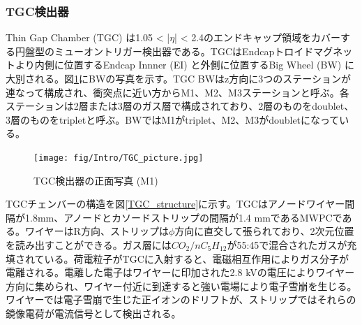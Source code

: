 \subsubsection*{TGC検出器}
Thin Gap Chamber  (TGC) は1.05 < |$\eta$| < 2.4のエンドキャップ領域をカバーする円盤型のミューオントリガー検出器である。TGCはEndcapトロイドマグネットより内側に位置するEndcap Innner  (EI) と外側に位置するBig Wheel  (BW) に大別される。図\ref{TGC_picture}にBWの写真を示す。TGC BWはz方向に3つのステーションが連なって構成され、衝突点に近い方からM1、M2、M3ステーションと呼ぶ。各ステーションは2層または3層のガス層で構成されており、2層のものをdoublet、3層のものをtripletと呼ぶ。BWではM1がtriplet、M2、M3がdoubletになっている。

\begin{figure} 
\centering
\texttt{[image: fig/Intro/TGC\_picture.jpg]}
\caption[TGC検出器]{TGC検出器の正面写真 (M1)\cite{cern_document_server}}
\label{TGC_picture}
\end{figure}

TGCチェンバーの構造を図\ref{TGC_structure}に示す。TGCはアノードワイヤー間隔が1.8mm、アノードとカソードストリップの間隔が1.4 mmであるMWPCである。ワイヤーはR方向、ストリップは$\phi$方向に直交して張られており、2次元位置を読み出すことができる。ガス層には$CO_2/nC_5H_{12}$が55:45で混合されたガスが充填されている。荷電粒子がTGCに入射すると、電磁相互作用によりガス分子が電離される。電離した電子はワイヤーに印加された2.8 kVの電圧によりワイヤー方向に集められ、ワイヤー付近に到達すると強い電場により電子雪崩を生じる。ワイヤーでは電子雪崩で生じた正イオンのドリフトが、ストリップではそれらの鏡像電荷が電流信号として検出される。

